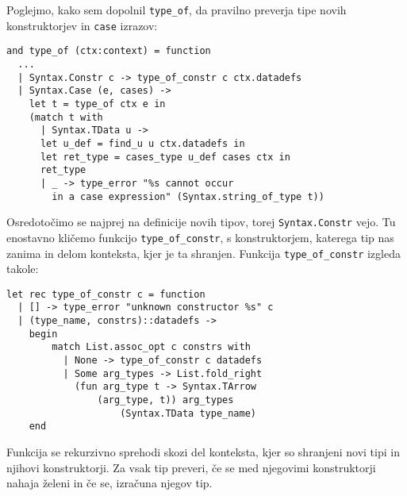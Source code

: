 \documentclass[12pt,a4paper,openany]{book}
\begin{document}
Poglejmo, kako sem dopolnil \lstinline{type_of}, da pravilno preverja tipe novih konstruktorjev in \lstinline{case} izrazov:
\begin{lstlisting}
and type_of (ctx:context) = function
  ...
  | Syntax.Constr c -> type_of_constr c ctx.datadefs
  | Syntax.Case (e, cases) -> 
    let t = type_of ctx e in
    (match t with
      | Syntax.TData u -> 
      let u_def = find_u u ctx.datadefs in
      let ret_type = cases_type u_def cases ctx in
      ret_type
      | _ -> type_error "%s cannot occur 
        in a case expression" (Syntax.string_of_type t))
\end{lstlisting}
Osredotočimo se najprej na definicije novih tipov, torej \lstinline{Syntax.Constr} vejo. Tu enostavno kličemo funkcijo \lstinline{type_of_constr}, s konstruktorjem, katerega tip nas zanima in delom 
konteksta, kjer je ta shranjen. Funkcija \lstinline{type_of_constr} izgleda takole:
\begin{lstlisting}
let rec type_of_constr c = function
  | [] -> type_error "unknown constructor %s" c
  | (type_name, constrs)::datadefs -> 
    begin
        match List.assoc_opt c constrs with
          | None -> type_of_constr c datadefs
          | Some arg_types -> List.fold_right 
            (fun arg_type t -> Syntax.TArrow 
                (arg_type, t)) arg_types 
                    (Syntax.TData type_name) 
    end
\end{lstlisting}
Funkcija se rekurzivno sprehodi skozi del konteksta, kjer so shranjeni novi tipi in njihovi konstruktorji. Za vsak tip preveri, če se med njegovimi konstruktorji nahaja želeni in če se, izračuna 
njegov tip. 
\end{document}

